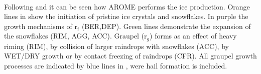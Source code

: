 \\
Following \cite{pinty_mixed-phased_1998} and  it can be seen how AROME performs the ice production. Orange lines in  show the initiation of pristine ice crystals and snowflakes. In purple the growth mechanisms of r$_i$ (BER,DEP). Green lines demonstrate the expansion of the snowflakes (RIM, AGG, ACC). Graupel (r$_g$) forms as an effect of heavy riming (RIM), by collision of larger raindrops with snowflakes (ACC), by WET/DRY growth or by contact freezing of raindrops (CFR). All graupel growth processes are indicated by blue lines in , were hail formation is included. 


%



%
